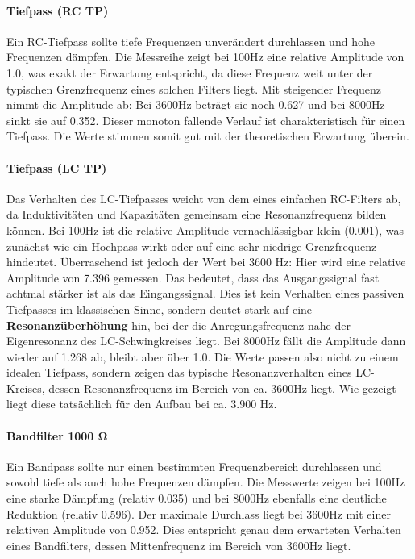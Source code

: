

\paragraph{Tiefpass (RC TP)}
Ein RC-Tiefpass sollte tiefe Frequenzen unverändert durchlassen und hohe Frequenzen dämpfen. Die Messreihe zeigt bei 100Hz eine relative Amplitude von 1.0, was exakt der Erwartung entspricht, da diese Frequenz weit unter der typischen Grenzfrequenz eines solchen Filters liegt. Mit steigender Frequenz nimmt die Amplitude ab: Bei 3600Hz beträgt sie noch 0.627 und bei 8000Hz sinkt sie auf 0.352. Dieser monoton fallende Verlauf ist charakteristisch für einen Tiefpass. Die Werte stimmen somit gut mit der theoretischen Erwartung überein.

\paragraph{Tiefpass (LC TP)}
Das Verhalten des LC-Tiefpasses weicht von dem eines einfachen RC-Filters ab, da Induktivitäten und Kapazitäten gemeinsam eine Resonanzfrequenz bilden können. Bei 100Hz ist die relative Amplitude vernachlässigbar klein (0.001), was zunächst wie ein Hochpass wirkt oder auf eine sehr niedrige Grenzfrequenz hindeutet. Überraschend ist jedoch der Wert bei 3600 Hz: Hier wird eine relative Amplitude von 7.396 gemessen. Das bedeutet, dass das Ausgangssignal fast achtmal stärker ist als das Eingangssignal. Dies ist kein Verhalten eines passiven Tiefpasses im klassischen Sinne, sondern deutet stark auf eine \textbf{Resonanzüberhöhung} hin, bei der die Anregungsfrequenz nahe der Eigenresonanz des LC-Schwingkreises liegt. Bei 8000Hz fällt die Amplitude dann wieder auf 1.268 ab, bleibt aber über 1.0. Die Werte passen also nicht zu einem idealen Tiefpass, sondern zeigen das typische Resonanzverhalten eines LC-Kreises, dessen Resonanzfrequenz im Bereich von ca. 3600Hz liegt. Wie gezeigt liegt diese tatsächlich für den Aufbau bei ca. 3.900 Hz.


\paragraph{Bandfilter 1000 $\mathbf{\Omega}$}
Ein Bandpass sollte nur einen bestimmten Frequenzbereich durchlassen und sowohl tiefe als auch hohe Frequenzen dämpfen. Die Messwerte zeigen bei 100Hz eine starke Dämpfung (relativ 0.035) und bei 8000Hz ebenfalls eine deutliche Reduktion (relativ 0.596). Der maximale Durchlass liegt bei 3600Hz mit einer relativen Amplitude von 0.952. Dies entspricht genau dem erwarteten Verhalten eines Bandfilters, dessen Mittenfrequenz im Bereich von 3600Hz liegt. 

